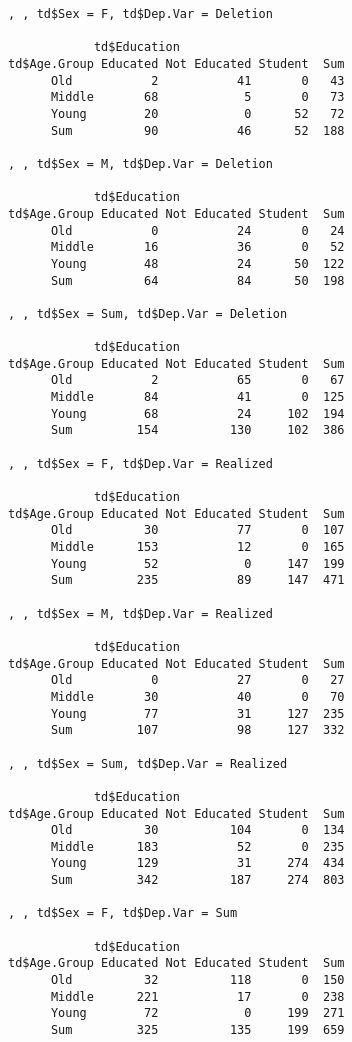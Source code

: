 \documentclass[
  12pt,
  letterpaper]{article}
\begin{document}
\begin{verbatim}
, , td$Sex = F, td$Dep.Var = Deletion

            td$Education
td$Age.Group Educated Not Educated Student  Sum
      Old           2           41       0   43
      Middle       68            5       0   73
      Young        20            0      52   72
      Sum          90           46      52  188

, , td$Sex = M, td$Dep.Var = Deletion

            td$Education
td$Age.Group Educated Not Educated Student  Sum
      Old           0           24       0   24
      Middle       16           36       0   52
      Young        48           24      50  122
      Sum          64           84      50  198

, , td$Sex = Sum, td$Dep.Var = Deletion

            td$Education
td$Age.Group Educated Not Educated Student  Sum
      Old           2           65       0   67
      Middle       84           41       0  125
      Young        68           24     102  194
      Sum         154          130     102  386

, , td$Sex = F, td$Dep.Var = Realized

            td$Education
td$Age.Group Educated Not Educated Student  Sum
      Old          30           77       0  107
      Middle      153           12       0  165
      Young        52            0     147  199
      Sum         235           89     147  471

, , td$Sex = M, td$Dep.Var = Realized

            td$Education
td$Age.Group Educated Not Educated Student  Sum
      Old           0           27       0   27
      Middle       30           40       0   70
      Young        77           31     127  235
      Sum         107           98     127  332

, , td$Sex = Sum, td$Dep.Var = Realized

            td$Education
td$Age.Group Educated Not Educated Student  Sum
      Old          30          104       0  134
      Middle      183           52       0  235
      Young       129           31     274  434
      Sum         342          187     274  803

, , td$Sex = F, td$Dep.Var = Sum

            td$Education
td$Age.Group Educated Not Educated Student  Sum
      Old          32          118       0  150
      Middle      221           17       0  238
      Young        72            0     199  271
      Sum         325          135     199  659


\end{verbatim}
\end{document}
